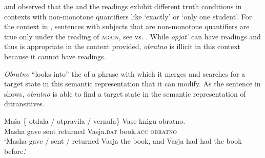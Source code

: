 \documentclass[output=paper]{langscibook}
\begin{document}
\noindent \citet{Alexiadou-etal2014} and \citet{Lechner-etal2015} observed that the  and the  readings exhibit different truth conditions in contexts with non-monotone quantifiers like ‘exactly' or `only one student’. For the context in , sentences with subjects that are non-monotone quantifiers are true only under the  reading of \textsc{again}, see  vs. . While \textit{opjat’} can have  readings and thus  is appropriate in the context provided, \textit{obratno} is illicit in this context because it cannot have  readings.



\textit{Obratno} “looks into” the  of a  phrase with which it merges and searches for a target state in this semantic representation that it can modify. As the sentence in  shows, \textit{obratno} is able to find a target state in the semantic representation of  ditransitives.


 \ea\label{ex:bondarenko:20}
\gll Maša \{\hspace{-2pt} otdala / otpravila / vernula\} Vase knigu obratno.\\
     Masha {} gave {} sent {} returned Vasja.\textsc{dat} book.\textsc{acc} \textsc{obratno}\\
\glt `Masha gave / sent / returned Vasja the book, and Vasja had had the book before.'
\z
\end{document}

